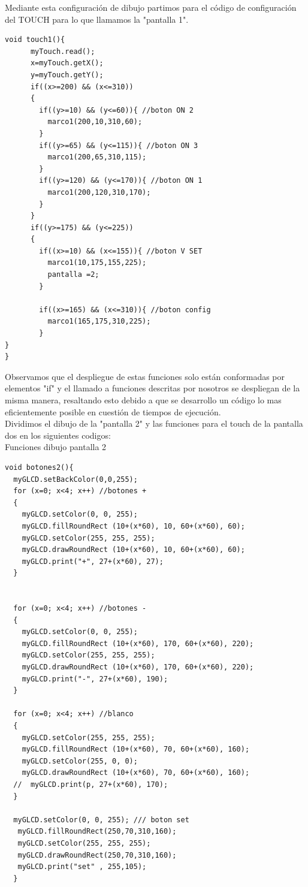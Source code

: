 Mediante esta configuración de dibujo partimos para el código de configuración del TOUCH para lo que llamamos la "pantalla 1".

\begin{verbatim}
void touch1(){ 
      myTouch.read();
      x=myTouch.getX();
      y=myTouch.getY();
      if((x>=200) && (x<=310))
      {
        if((y>=10) && (y<=60)){ //boton ON 2
          marco1(200,10,310,60);
        }
        if((y>=65) && (y<=115)){ //boton ON 3
          marco1(200,65,310,115);
        }
        if((y>=120) && (y<=170)){ //boton ON 1
          marco1(200,120,310,170);
        }
      }
      if((y>=175) && (y<=225))
      {
        if((x>=10) && (x<=155)){ //boton V SET
          marco1(10,175,155,225);
          pantalla =2;
        }
      
        if((x>=165) && (x<=310)){ //boton config
          marco1(165,175,310,225);
        }
}
}
\end{verbatim}

Observamos que el despliegue de estas funciones solo están conformadas por elementos "if" y el llamado a funciones descritas por nosotros se despliegan de la misma manera, resaltando esto debido a que se desarrollo un código lo mas eficientemente posible en cuestión de tiempos de ejecución. \\

Dividimos el dibujo de la "pantalla 2" y las funciones para el touch de la pantalla dos en los siguientes codigos:\\

Funciones dibujo pantalla 2

\begin{verbatim}
void botones2(){
  myGLCD.setBackColor(0,0,255);
  for (x=0; x<4; x++) //botones +
  {
    myGLCD.setColor(0, 0, 255);
    myGLCD.fillRoundRect (10+(x*60), 10, 60+(x*60), 60);
    myGLCD.setColor(255, 255, 255);
    myGLCD.drawRoundRect (10+(x*60), 10, 60+(x*60), 60);
    myGLCD.print("+", 27+(x*60), 27);
  }


  for (x=0; x<4; x++) //botones -
  {
    myGLCD.setColor(0, 0, 255);
    myGLCD.fillRoundRect (10+(x*60), 170, 60+(x*60), 220);
    myGLCD.setColor(255, 255, 255);
    myGLCD.drawRoundRect (10+(x*60), 170, 60+(x*60), 220);
    myGLCD.print("-", 27+(x*60), 190);
  }

  for (x=0; x<4; x++) //blanco 
  {
    myGLCD.setColor(255, 255, 255);
    myGLCD.fillRoundRect (10+(x*60), 70, 60+(x*60), 160);
    myGLCD.setColor(255, 0, 0);
    myGLCD.drawRoundRect (10+(x*60), 70, 60+(x*60), 160);
  //  myGLCD.print(p, 27+(x*60), 170);
  }

  myGLCD.setColor(0, 0, 255); /// boton set
   myGLCD.fillRoundRect(250,70,310,160);
   myGLCD.setColor(255, 255, 255);
   myGLCD.drawRoundRect(250,70,310,160);
   myGLCD.print("set" , 255,105);
  }
\end{verbatim}

